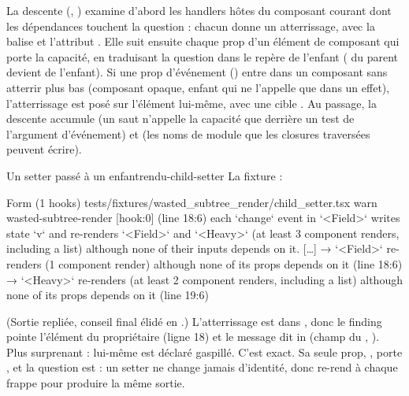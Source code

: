 La descente (, ) examine d'abord les
handlers hôtes du composant courant dont les dépendances touchent la question : chacun donne un
atterrissage, avec la balise et l'attribut . Elle suit ensuite chaque prop d'un
élément de composant qui porte la capacité, en traduisant la question dans le repère de l'enfant
( du parent devient  de l'enfant). Si une prop
d'événement () entre dans un composant sans atterrir plus bas (composant opaque, enfant
qui ne l'appelle que dans un effet), l'atterrissage est posé sur l'élément lui-même, avec une
cible . Au passage, la descente accumule  (un saut
n'appelle la capacité que derrière un test de l'argument d'événement) et  (les noms
de module que les closures traversées peuvent écrire).

\begin{exemple}{Un setter passé à un enfant}{rendu-child-setter}
La fixture  :
\begin{sortie}
  Form  (1 hooks)  tests/fixtures/wasted_subtree_render/child_setter.tsx
    warn   wasted-subtree-render  [hook:0]  (line 18:6)  each `change` event in `<Field>` writes
      state `v` and re-renders `<Field>` and `<Heavy>` (at least 3 component renders, including a
      list) although none of their inputs depends on it. […]
       → `<Field>` re-renders (1 component render) although none of its props depends on it (line 18:6)
       → `<Heavy>` re-renders (at least 2 component renders, including a list) although none of its
         props depends on it (line 19:6)
\end{sortie}
(Sortie repliée, conseil final élidé en \og[…]\fg{}.) L'atterrissage est dans , donc
le finding pointe l'élément  du propriétaire (ligne 18) et le message dit
\og in \fg{} (champ  du ,
). Plus surprenant : 
lui-même est déclaré gaspillé. C'est exact. Sa seule prop, , porte
, et la question est  : un setter ne change jamais
d'identité, donc  re-rend à chaque frappe pour produire la même sortie.
\end{exemple}

